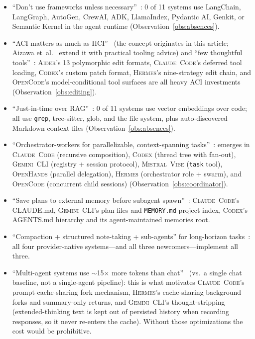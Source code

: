 \documentclass[11pt,a4paper]{article}
\newcommand{\clcode}{\textsc{Claude~Code}\xspace}
\newcommand{\cdx}{\textsc{Codex}\xspace}
\newcommand{\oh}{\textsc{OpenHands}\xspace}
\newcommand{\adr}{\textsc{Aider}\xspace}
\newcommand{\vibe}{\textsc{Mistral~Vibe}\xspace}
\newcommand{\gemini}{\textsc{Gemini~CLI}\xspace}
\newcommand{\hrm}{\textsc{Hermes}\xspace}
\newcommand{\ocd}{\textsc{OpenCode}\xspace}
\begin{document}
\begin{itemize}[itemsep=2pt]
  \item ``Don't use frameworks unless necessary''~\cite{schluntz2024agents}: 0 of 11 systems use LangChain, LangGraph, AutoGen, CrewAI, ADK, LlamaIndex, Pydantic AI, Genkit, or Semantic Kernel in the agent runtime (Observation~\ref{obs:absences}).
  \item ``ACI matters as much as HCI''~\cite{schluntz2024agents} (the concept originates in this article; Aizawa et~al.~\cite{aizawa2025tools} extend it with practical tooling advice) and ``few thoughtful tools''~\cite{aizawa2025tools}: \adr{}'s 13 polymorphic edit formats, \clcode{}'s deferred tool loading, \cdx{}'s custom patch format, \hrm{}'s nine-strategy edit chain, and \ocd{}'s model-conditional tool surfaces are all heavy ACI investments (Observation~\ref{obs:editing}).
  \item ``Just-in-time over RAG''~\cite{rajasekaran2025context}: 0 of 11 systems use vector embeddings over code; all use \texttt{grep}, tree-sitter, glob, and the file system, plus auto-discovered Markdown context files (Observation~\ref{obs:absences}).
  \item ``Orchestrator-workers for parallelizable, context-spanning tasks''~\cite{hadfield2025multiagent}: emerges in \clcode{} (recursive composition), \cdx{} (thread tree with fan-out), \gemini{} (registry + session protocol), \vibe{} (\texttt{task} tool), \oh{} (parallel delegation), \hrm{} (orchestrator role + swarm), and \ocd{} (concurrent child sessions) (Observation~\ref{obs:coordinator}).
  \item ``Save plans to external memory before subagent spawn''~\cite{hadfield2025multiagent}: \clcode{}'s CLAUDE.md, \gemini{}'s plan files and \texttt{MEMORY.md} project index, \cdx{}'s AGENTS.md hierarchy and its agent-maintained memories root.
  \item ``Compaction + structured note-taking + sub-agents'' for long-horizon tasks~\cite{rajasekaran2025context}: all four provider-native systems---and all three newcomers---implement all three.
  \item ``Multi-agent systems use $\sim$15$\times$ more tokens than chat''~\cite{hadfield2025multiagent} (vs.\ a single chat baseline, not a single-agent pipeline): this is what motivates \clcode{}'s prompt-cache-sharing fork mechanism, \hrm{}'s cache-sharing background forks and summary-only returns, and \gemini{}'s thought-stripping (extended-thinking text is kept out of persisted history when recording responses, so it never re-enters the cache). Without those optimizations the cost would be prohibitive.
\end{itemize}
\end{document}

